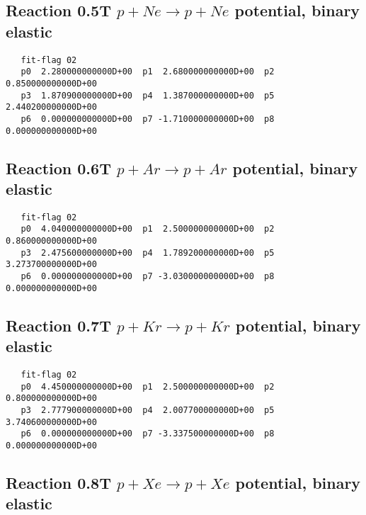 \documentclass[12pt,dvipdfmx]{article}
\begin{document}
\newpage

\subsection{
Reaction 0.5T   $ p + Ne \rightarrow p + Ne $ potential, binary elastic
}

\begin{small}\begin{verbatim}
   fit-flag 02
   p0  2.280000000000D+00  p1  2.680000000000D+00  p2  0.850000000000D+00
   p3  1.870900000000D+00  p4  1.387000000000D+00  p5  2.440200000000D+00
   p6  0.000000000000D+00  p7 -1.710000000000D+00  p8  0.000000000000D+00
\end{verbatim}\end{small}


\newpage

\subsection{
Reaction 0.6T   $ p + Ar \rightarrow p + Ar $ potential, binary elastic }

\begin{small}\begin{verbatim}
   fit-flag 02
   p0  4.040000000000D+00  p1  2.500000000000D+00  p2  0.860000000000D+00
   p3  2.475600000000D+00  p4  1.789200000000D+00  p5  3.273700000000D+00
   p6  0.000000000000D+00  p7 -3.030000000000D+00  p8  0.000000000000D+00
\end{verbatim}\end{small}


\newpage

\subsection{
Reaction 0.7T   $ p + Kr \rightarrow p + Kr $ potential, binary elastic }

\begin{small}\begin{verbatim}
   fit-flag 02
   p0  4.450000000000D+00  p1  2.500000000000D+00  p2  0.800000000000D+00
   p3  2.777900000000D+00  p4  2.007700000000D+00  p5  3.740600000000D+00
   p6  0.000000000000D+00  p7 -3.337500000000D+00  p8  0.000000000000D+00
\end{verbatim}\end{small}


\newpage

\subsection{
Reaction 0.8T   $ p + Xe \rightarrow p + Xe $ potential, binary elastic }
\end{document}
